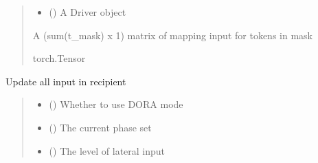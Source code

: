 \documentclass[letterpaper,10pt,english]{sphinxmanual}
\begin{document}
\begin{fulllineitems}
\begin{fulllineitems}
\begin{quote}
\begin{description}
\begin{itemize}
\item {} 
\sphinxAtStartPar
{} ({\hyperref[\detokenize{nodes:nodes.nodeTensors.Driver}]{}}) \textendash{} A Driver object

\end{itemize}

\sphinxAtStartPar
A (sum(t\_mask) x 1) matrix of mapping input for tokens in mask

\sphinxAtStartPar
torch.Tensor

\end{description}\end{quote}

\end{fulllineitems}


\begin{fulllineitems}
\label{\detokenize{nodes:nodes.nodeTensors.Recipient.update_input}}
\pysigstartsignatures
\pysiglinewithargsret
{}
{\sphinxparamcomma {}\sphinxparamcomma {}\sphinxparamcomma {}\sphinxparamcomma {}\sphinxparamcomma {}\sphinxparamcomma {}}
{}
\pysigstopsignatures
\sphinxAtStartPar
Update all input in recipient
\begin{quote}\begin{description}
\begin{itemize}
\item {} 
\sphinxAtStartPar
{} () \textendash{} Whether to use DORA mode

\item {} 
\sphinxAtStartPar
{} () \textendash{} The current phase set

\item {} 
\sphinxAtStartPar
{} () \textendash{} The level of lateral input


\end{itemize}
\end{description}
\end{quote}
\end{fulllineitems}
\end{fulllineitems}
\end{document}
